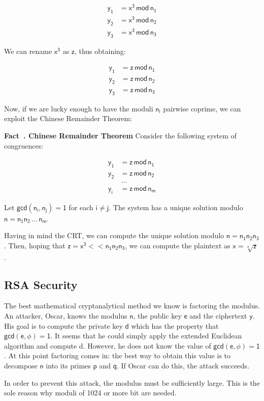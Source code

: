 \documentclass{article}
\newcounter{fact}[section]
\newenvironment{fact}[1][]{\refstepcounter{fact}\par\medskip
   \noindent \textbf{Fact~\thefact. #1} \rmfamily}{\medskip}
\begin{document}
\begin{align*}
    \mathsf{y_1} &= \mathsf{x^3 \, mod \, n_1}\\
    \mathsf{y_2} &= \mathsf{x^3 \, mod \, n_2} \\
    \mathsf{y_3} &= \mathsf{x^3 \, mod \, n_3}
\end{align*}

\noindent We can rename $\mathsf{x^3}$ as $\mathsf{z}$, thus obtaining:

\begin{align*}
    \mathsf{y_1} &= \mathsf{z \, mod \, n_1} \\
    \mathsf{y_2} &= \mathsf{z \, mod \, n_2} \\
    \mathsf{y_3} &= \mathsf{z \, mod \, n_3}
\end{align*}

\noindent Now, if we are lucky enough to have the moduli $\mathsf{n_i}$ pairwise coprime, we can exploit the Chinese Remainder Theorem:

\begin{fact}[Chinese Remainder Theorem]
    Consider the following system of congruences:

    \begin{align*}
        \mathsf{y_1} &= \mathsf{z \, mod \, n_1} \\
        \mathsf{y_2} &= \mathsf{z \, mod \, n_2} \\
        & \, \dots \\
        \mathsf{y_i} &= \mathsf{z \, mod \, n_m}
    \end{align*}

    Let $\mathsf{gcd(n_i, n_j) = 1}$ for each $\mathsf{i \neq j}$. The system has a unique solution modulo $\mathsf{n = n_1 n_2 \, \dots \, n_m}$.
\end{fact}

\noindent Having in mind the CRT, we can compute the unique solution modulo $\mathsf{n = n_1 n_2 n_3}$. Then, hoping that $\mathsf{z = x^3 << n_1 n_2 n_3}$, we can compute the plaintext as $\mathsf{x = \sqrt[e]{z}}$.

\subsection{RSA Security}
\par The best mathematical cryptanalytical method we know is factoring the modulus. An attacker, Oscar, knows the modulus $\mathsf{n}$, the public key $\mathsf{e}$ and the ciphertext $\mathsf{y}$. His goal is to compute the private key $\mathsf{d}$ which has the property that $\mathsf{gcd(e, \phi) = 1}$. It seems that he could simply apply the extended Euclidean algorithm and compute d. However, he does not know the value of $\mathsf{gcd(e, \phi) = 1}$. At this point factoring comes in: the best way to obtain this value is to decompose $\mathsf{n}$ into its primes $\mathsf{p}$ and $\mathsf{q}$. If Oscar can do this, the attack succeeds.

\noindent In order to prevent this attack, the modulus must be sufﬁciently large. This is the sole reason why moduli of 1024 or more bit are needed.
\end{document}
